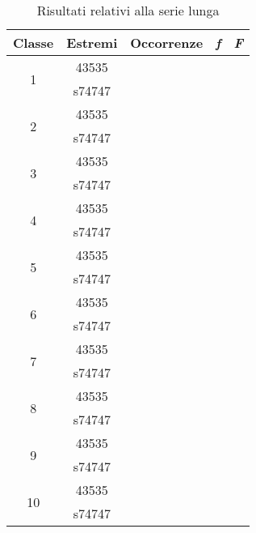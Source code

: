 \begin{table}[H]
	\centering
	\begin{tabular}{c|c|c|c|c}
		\toprule
		\toprule
		\textbf{Classe}&\textbf{Estremi} &\textbf{Occorrenze}&\textbf{\textit{f}}&\textbf{\textit{F}}\\
		\midrule
		\midrule
		\multirow{2}{*}{1}&43535&\multirow{2}{*}{}&\multirow{2}{*}{}&\multirow{2}{*}{} \\
		&s74747&&&\\
		\midrule
		\multirow{2}{*}{2}&43535&\multirow{2}{*}{}&\multirow{2}{*}{}&\multirow{2}{*}{} \\
		&s74747&&&\\
		\midrule
		\multirow{2}{*}{3}&43535&\multirow{2}{*}{}&\multirow{2}{*}{}&\multirow{2}{*}{} \\
		&s74747&&&\\
		\midrule
		\multirow{2}{*}{4}&43535&\multirow{2}{*}{}&\multirow{2}{*}{}&\multirow{2}{*}{} \\
		&s74747&&&\\
		\midrule
		\multirow{2}{*}{5}&43535&\multirow{2}{*}{}&\multirow{2}{*}{}&\multirow{2}{*}{} \\
		&s74747&&&\\
		\midrule
		\multirow{2}{*}{6}&43535&\multirow{2}{*}{}&\multirow{2}{*}{}&\multirow{2}{*}{} \\
		&s74747&&&\\
		\midrule
		\multirow{2}{*}{7}&43535&\multirow{2}{*}{}&\multirow{2}{*}{}&\multirow{2}{*}{} \\
		&s74747&&&\\
		\midrule
		\multirow{2}{*}{8}&43535&\multirow{2}{*}{}&\multirow{2}{*}{}&\multirow{2}{*}{} \\
		&s74747&&&\\
		\midrule
		\multirow{2}{*}{9}&43535&\multirow{2}{*}{}&\multirow{2}{*}{}&\multirow{2}{*}{} \\
		&s74747&&&\\
		\midrule
		\multirow{2}{*}{10}&43535&\multirow{2}{*}{}&\multirow{2}{*}{}&\multirow{2}{*}{} \\
		&s74747&&&\\
		\bottomrule
		\bottomrule
	\end{tabular}
	\caption{Risultati relativi alla serie lunga}
	\label{tab:serielunga}
\end{table} 
